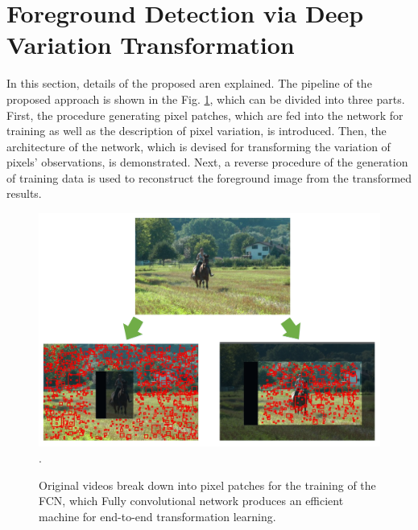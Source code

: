 \documentclass[journal]{IEEEtran}
\newcommand{\reffig}[1]{Fig. \ref{#1}}
\DeclareMathOperator*{\argmin}{argmin}
\begin{document}



\section{Foreground Detection via Deep Variation Transformation}
\label{sec4}
In this section, details of the proposed aren explained.
%
The pipeline of the proposed approach is shown in the \reffig{flow_chart},
which can be divided into three parts.
%
First, the procedure generating pixel patches,
which are fed into the network for training as well as the description of pixel variation,
is introduced.
%
Then,
the architecture of the network, which is devised for transforming the variation of pixels' observations, is demonstrated.
%
Next,
a reverse procedure of the generation of training data is used to reconstruct the foreground image from the transformed results.
%
%

\begin{figure}[!t] %
\centering
\includegraphics[width=\textwidth]{figure/fig2}
\DeclareGraphicsExtensions.
    \caption{ Original videos break down into pixel patches for the training of the FCN, which 
Fully convolutional network produces an efficient machine for end-to-end transformation learning.}
    \label{flow_chart}
\end{figure}
\end{document}

